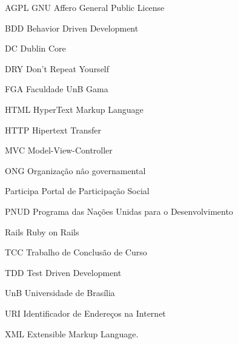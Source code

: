 \begin{siglas}
  \item[AGPL] GNU Affero General Public License
  \item[BDD] Behavior Driven Development
  \item[DC] Dublin Core
  \item[DRY] Don't Repeat Yourself
  \item[FGA] Faculdade UnB Gama
  \item[HTML] HyperText Markup Language
  \item[HTTP] Hipertext Transfer
  \item[MVC] Model-View-Controller
  \item[ONG] Organização não governamental
  \item[Participa] Portal de Participação Social
  \item[PNUD] Programa das Nações Unidas para o Desenvolvimento
  \item[Rails] Ruby on Rails
  \item[TCC] Trabalho de Conclusão de Curso
  \item[TDD] Test Driven Development
  \item[UnB] Universidade de Brasília
  \item[URI]  Identificador de Endereços na Internet  
  \item[XML] Extensible Markup Language.
\end{siglas}
